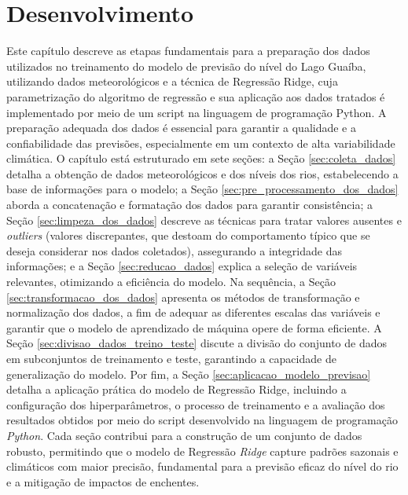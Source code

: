\chapter{Desenvolvimento}
\label{cap:desenvolvimento}

Este capítulo descreve as etapas fundamentais para a preparação dos dados utilizados no treinamento do modelo de previsão do nível do Lago Guaíba, utilizando dados meteorológicos e a técnica de Regressão Ridge, cuja parametrização do algoritmo de regressão e sua aplicação aos dados tratados é implementado por meio de um script na linguagem de programação Python. A preparação adequada dos dados é essencial para garantir a qualidade e a confiabilidade das previsões, especialmente em um contexto de alta variabilidade climática. O capítulo está estruturado em sete seções: a Seção \ref{sec:coleta_dados} detalha a obtenção de dados meteorológicos e dos níveis dos rios, estabelecendo a base de informações para o modelo; a Seção \ref{sec:pre_processamento_dos_dados} aborda a concatenação e formatação dos dados para garantir consistência; a Seção \ref{sec:limpeza_dos_dados} descreve as técnicas para tratar valores ausentes e \textit{outliers} (valores discrepantes, que destoam do comportamento típico que se deseja considerar nos dados coletados), assegurando a integridade das informações; e a Seção \ref{sec:reducao_dados} explica a seleção de variáveis relevantes, otimizando a eficiência do modelo. Na sequência, a Seção \ref{sec:transformacao_dos_dados} apresenta os métodos de transformação e normalização dos dados, a fim de adequar as diferentes escalas das variáveis e garantir que o modelo de aprendizado de máquina opere de forma eficiente. A Seção \ref{sec:divisao_dados_treino_teste} discute a divisão do conjunto de dados em subconjuntos de treinamento e teste, garantindo a capacidade de generalização do modelo. Por fim, a Seção \ref{sec:aplicacao_modelo_previsao} detalha a aplicação prática do modelo de Regressão Ridge, incluindo a configuração dos hiperparâmetros, o processo de treinamento e a avaliação dos resultados obtidos por meio do script desenvolvido na linguagem de programação \textit{Python}. Cada seção contribui para a construção de um conjunto de dados robusto, permitindo que o modelo de Regressão \textit{Ridge} capture padrões sazonais e climáticos com maior precisão, fundamental para a previsão eficaz do nível do rio e a mitigação de impactos de enchentes.

